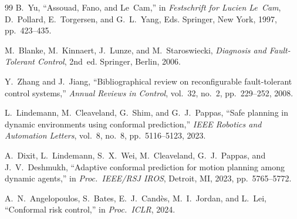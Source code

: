 \begin{thebibliography}{99}
B.~Yu,
``Assouad, Fano, and Le~Cam,''
in \emph{Festschrift for Lucien Le~Cam}, D.~Pollard, E.~Torgersen,
and G.~L.~Yang, Eds.
Springer, New York, 1997, pp.~423--435.

M.~Blanke, M.~Kinnaert, J.~Lunze, and M.~Staroswiecki,
\emph{Diagnosis and Fault-Tolerant Control}, 2nd~ed.
Springer, Berlin, 2006.

Y.~Zhang and J.~Jiang,
``Bibliographical review on reconfigurable fault-tolerant control systems,''
\emph{Annual Reviews in Control}, vol.~32, no.~2, pp.~229--252, 2008.

L.~Lindemann, M.~Cleaveland, G.~Shim, and G.~J.~Pappas,
``Safe planning in dynamic environments using conformal prediction,''
\emph{IEEE Robotics and Automation Letters}, vol.~8, no.~8,
pp.~5116--5123, 2023.

A.~Dixit, L.~Lindemann, S.~X.~Wei, M.~Cleaveland, G.~J.~Pappas,
and J.~V.~Deshmukh,
``Adaptive conformal prediction for motion planning among dynamic agents,''
in \emph{Proc.\ IEEE/RSJ IROS}, Detroit, MI, 2023, pp.~5765--5772.

A.~N.~Angelopoulos, S.~Bates, E.~J.~Cand\`{e}s, M.~I.~Jordan,
and L.~Lei,
``Conformal risk control,''
in \emph{Proc.\ ICLR}, 2024.

\end{thebibliography}

